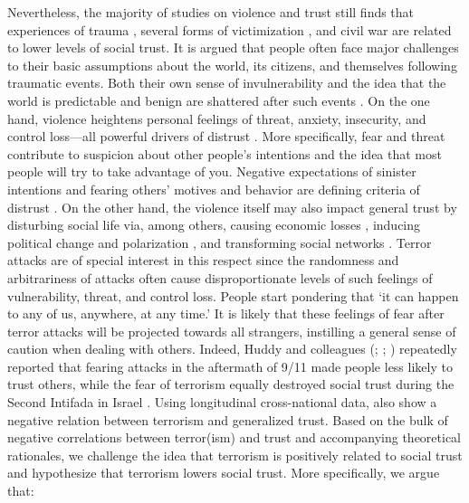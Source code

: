 Nevertheless, the majority of studies on violence and trust still finds that experiences of trauma \citep{Alesina2002}, several forms of victimization \citep{Brehm1997a, Dinesen2012, Salmi2007}, and civil war \citep{Kijewski2016} are related to lower levels of social trust. It is argued that people often face major challenges to their basic assumptions about the world, its citizens, and themselves following traumatic events. Both their own sense of invulnerability and the idea that the world is predictable and benign are shattered after such events \citep{Janoff-Bulman1989, Janoff-Bulman1992}. On the one hand, violence heightens personal feelings of threat, anxiety, insecurity, and control loss---all powerful drivers of distrust \citep{Delhey2003b}. More specifically, fear and threat contribute to suspicion about other people’s intentions and the idea that most people will try to take advantage of you. Negative expectations of sinister intentions and fearing others’ motives and behavior are defining criteria of distrust \citep{Kijewski2016, Lewicki1998}. On the other hand, the violence itself may also impact general trust by disturbing social life via, among others, causing economic losses \citep{Sandler2008}, inducing political change and polarization \citep{Alonso2013a, LaFree2015, Montalvo2011}, and transforming social networks \citep{Paxton2005, Wood2008}. Terror attacks are of special interest in this respect since the randomness and arbitrariness of attacks often cause disproportionate levels of such feelings of vulnerability, threat, and control loss. People start pondering that `it can happen to any of us, anywhere, at any time.' It is likely that these feelings of fear after terror attacks will be projected towards all strangers, instilling a general sense of caution when dealing with others. Indeed, Huddy and colleagues (\citeyear{Huddy2002}; \citeyear{Huddy2005}; \citeyear{Huddy2007b}) repeatedly reported that fearing attacks in the aftermath of 9/11 made people less likely to trust others, while the fear of terrorism equally destroyed social trust during the Second Intifada in Israel \citep{Uslaner2005}. Using longitudinal cross-national data, \cite{Blomberg2011} also show a negative relation between terrorism and generalized trust. Based on the bulk of negative correlations between terror(ism) and trust and accompanying theoretical rationales, we challenge the idea that terrorism is positively related to social trust and hypothesize that terrorism lowers social trust. More specifically, we argue that:


